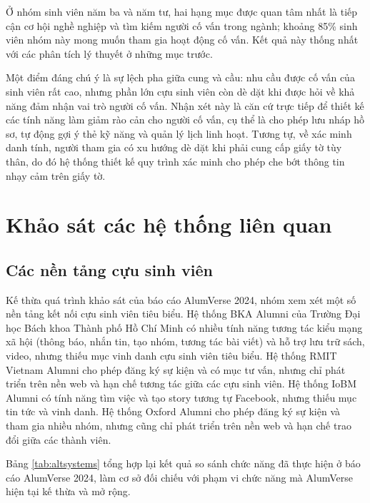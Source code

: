 \documentclass[12pt,a4paper,oneside]{report}
\begin{document}
Ở nhóm sinh viên năm ba và năm tư, hai hạng mục được quan tâm nhất là tiếp cận cơ hội nghề nghiệp và tìm kiếm người cố vấn trong ngành; khoảng 85\% sinh viên nhóm này mong muốn tham gia hoạt động cố vấn. Kết quả này thống nhất với các phân tích lý thuyết ở những mục trước.

Một điểm đáng chú ý là sự lệch pha giữa cung và cầu: nhu cầu được cố vấn của sinh viên rất cao, nhưng phần lớn cựu sinh viên còn dè dặt khi được hỏi về khả năng đảm nhận vai trò người cố vấn. Nhận xét này là căn cứ trực tiếp để thiết kế các tính năng làm giảm rào cản cho người cố vấn, cụ thể là cho phép lưu nháp hồ sơ, tự động gợi ý thẻ kỹ năng và quản lý lịch linh hoạt. Tương tự, về xác minh danh tính, người tham gia có xu hướng dè dặt khi phải cung cấp giấy tờ tùy thân, do đó hệ thống thiết kế quy trình xác minh cho phép che bớt thông tin nhạy cảm trên giấy tờ.

\section{Khảo sát các hệ thống liên quan}

\subsection{Các nền tảng cựu sinh viên}

Kế thừa quá trình khảo sát của báo cáo AlumVerse 2024, nhóm xem xét một số nền tảng kết nối cựu sinh viên tiêu biểu. Hệ thống BKA Alumni của Trường Đại học Bách khoa Thành phố Hồ Chí Minh có nhiều tính năng tương tác kiểu mạng xã hội (thông báo, nhắn tin, tạo nhóm, tương tác bài viết) và hỗ trợ lưu trữ sách, video, nhưng thiếu mục vinh danh cựu sinh viên tiêu biểu. Hệ thống RMIT Vietnam Alumni cho phép đăng ký sự kiện và có mục tư vấn, nhưng chỉ phát triển trên nền web và hạn chế tương tác giữa các cựu sinh viên. Hệ thống IoBM Alumni có tính năng tìm việc và tạo story tương tự Facebook, nhưng thiếu mục tin tức và vinh danh. Hệ thống Oxford Alumni cho phép đăng ký sự kiện và tham gia nhiều nhóm, nhưng cũng chỉ phát triển trên nền web và hạn chế trao đổi giữa các thành viên.

Bảng \ref{tab:altsystems} tổng hợp lại kết quả so sánh chức năng đã thực hiện ở báo cáo AlumVerse 2024, làm cơ sở đối chiếu với phạm vi chức năng mà AlumVerse hiện tại kế thừa và mở rộng.
\end{document}
